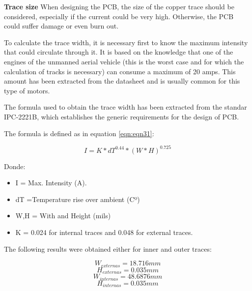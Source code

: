 \textbf{Trace size} \newline
When designing the PCB, the size of the copper trace should be considered, especially if the current could be very high. Otherwise, the PCB could suffer damage or even burn out. \newline

To calculate the trace width, it is necessary first to know the maximum intensity that could circulate through it. It is based on the knowledge that one of the engines of the unmanned aerial vehicle (this is the worst case and for which the calculation of tracks is necessary) can consume a maximum of 20 amps. This amount has been extracted from the datasheet and is usually common for this type of motors. \newline

The formula used to obtain the trace width has been extracted from the standar IPC-2221B, which establishes the generic requirements for the design of PCB.\newline

The formula is defined as in equation \ref{eqn:eqn31}: 

\begin{equation}
I = K * dT^{0.44}*(W*H)^{0.725}
\label{eqn:eqn31}
\end{equation}

Donde: 
\begin{itemize}
	\item I = Max. Intensity (A).
	\item dT =Temperature rise over ambient (Cº)
	\item W,H = With and Height (mils)
	\item K = 0.024 for internal traces and 0.048 for external traces.
\end{itemize}

The following results were obtained either for inner and outer traces:

\begin{equation*}
W_{externas} = 18.716 mm 
\end{equation*} 
\begin{equation*}
H_{externas} = 	0.035 mm
\end{equation*}
\begin{equation*}
W_{internas} =  48.6876 mm 
\end{equation*} 
\begin{equation*}
H_{internas} = 	0.035 mm
\end{equation*}

